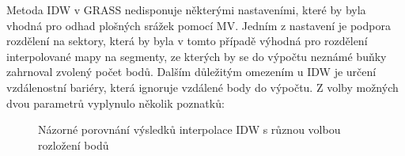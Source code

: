 \documentclass[a4paper,12pt,oneside]{report}
\begin{document}
Metoda \ac{IDW} v GRASS nedisponuje některými nastaveními, které by byla vhodná
pro odhad plošných srážek pomocí MV. Jedním z nastavení je
podpora rozdělení na sektory, která by byla v tomto případě výhodná
pro rozdělení interpolované mapy na segmenty, ze kterých by se do
výpočtu neznámé buňky zahrnoval zvolený počet bodů. Dalším důležitým
omezením u IDW je určení vzdálenostní bariéry, která ignoruje vzdálené
body do výpočtu. Z volby možných dvou parametrů vyplynulo několik
poznatků:
\begin{figure}[h!]%
    \centering
    \qquad
       \caption[Interpolace IDW]{Názorné porovnání výsledků interpolace IDW s různou volbou rozložení bodů \centering}%

    \label{fig:example}%
\end{figure}
\end{document}
